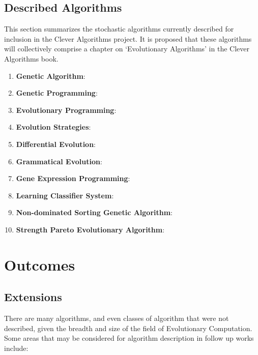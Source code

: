 \documentclass[a4paper, 11pt]{article}
\begin{document}
% 
% 
\subsection{Described Algorithms}
\label{subsec:algorithms}
This section summarizes the stochastic algorithms currently described for inclusion in the Clever Algorithms project. It is proposed that these algorithms will collectively comprise a chapter on `Evolutionary Algorithms' in the Clever Algorithms book. 

\begin{enumerate}
	\item \textbf{Genetic Algorithm}: \cite{Brownlee2010p}
	\item \textbf{Genetic Programming}: \cite{Brownlee2010q}
	\item \textbf{Evolutionary Programming}: \cite{Brownlee2010r}
	\item \textbf{Evolution Strategies}: \cite{Brownlee2010s}
	\item \textbf{Differential Evolution}: \cite{Brownlee2010t}
	\item \textbf{Grammatical Evolution}: \cite{Brownlee2010u}
	\item \textbf{Gene Expression Programming}: \cite{Brownlee2010v}
	\item \textbf{Learning Classifier System}: \cite{Brownlee2010w}
	\item \textbf{Non-dominated Sorting Genetic Algorithm}: \cite{Brownlee2010x}
	\item \textbf{Strength Pareto Evolutionary Algorithm}: \cite{Brownlee2010y}
\end{enumerate}

% 
% 
\section{Outcomes}
\label{sec:outcomes}

% 
% 
\subsection{Extensions}
There are many algorithms, and even classes of algorithm that were not described, given the breadth and size of the field of Evolutionary Computation. Some areas that may be considered for algorithm description in follow up works include:
\end{document}
